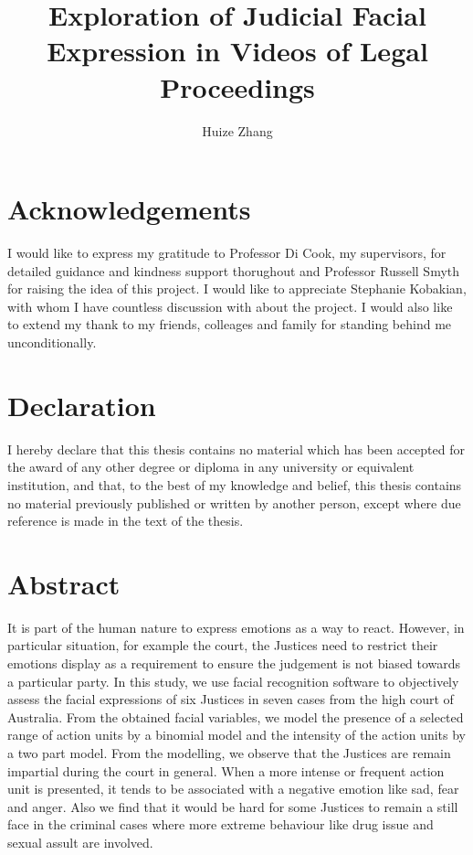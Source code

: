 \documentclass{monashthesis}
\author{Huize Zhang}
\title{Exploration of Judicial Facial Expression in Videos of Legal Proceedings}
\begin{document}

\titlepage

{\sf\tighttoc\doublespacing}

\clearpage{}\setcounter{page}{0}

\hypertarget{acknowledgements}{%
\chapter*{Acknowledgements}\label{acknowledgements}}

I would like to express my gratitude to Professor Di Cook, my supervisors, for detailed guidance and kindness support thorughout and Professor Russell Smyth for raising the idea of this project. I would like to appreciate Stephanie Kobakian, with whom I have countless discussion with about the project. I would also like to extend my thank to my friends, colleages and family for standing behind me unconditionally.

\hypertarget{declaration}{%
\chapter*{Declaration}\label{declaration}}

I hereby declare that this thesis contains no material which has been accepted for the award of any other degree or diploma in any university or equivalent institution, and that, to the best of my knowledge and belief, this thesis contains no material previously published or written by another person, except where due reference is made in the text of the thesis.

\vspace*{2cm}\par\authorname

\hypertarget{abstract}{%
\chapter*{Abstract}\label{abstract}}

It is part of the human nature to express emotions as a way to react. However, in particular situation, for example the court, the Justices need to restrict their emotions display as a requirement to ensure the judgement is not biased towards a particular party. In this study, we use facial recognition software to objectively assess the facial expressions of six Justices in seven cases from the high court of Australia. From the obtained facial variables, we model the presence of a selected range of action units by a binomial model and the intensity of the action units by a two part model. From the modelling, we observe that the Justices are remain impartial during the court in general. When a more intense or frequent action unit is presented, it tends to be associated with a negative emotion like sad, fear and anger. Also we find that it would be hard for some Justices to remain a still face in the criminal cases where more extreme behaviour like drug issue and sexual assult are involved.
\end{document}
